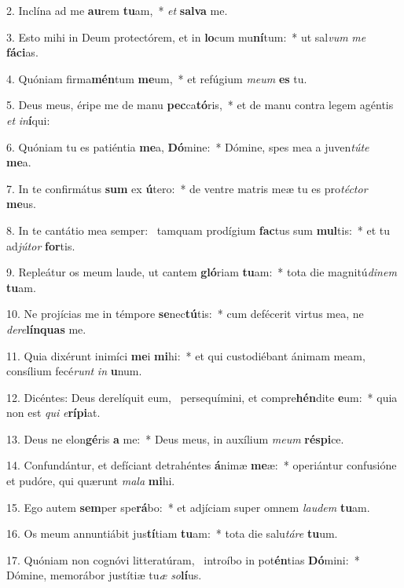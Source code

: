 2. Inclína ad me \textbf{au}rem \textbf{tu}am,~*  \textit{et} \textbf{sal}\textbf{va} me.\

3. Esto mihi in Deum protectórem, et in \textbf{lo}cum mu\textbf{ní}tum:~*  ut sal\textit{vum} \textit{me} \textbf{fá}\textbf{ci}as.\

4. Quóniam firma\textbf{mén}tum \textbf{me}um,~*  et refúgium \textit{me}\textit{um} \textbf{es} tu.\

5. Deus meus, éripe me de manu \textbf{pec}ca\textbf{tó}ris,~*  et de manu contra legem agéntis \textit{et} \textit{in}\textbf{í}qui:\

6. Quóniam tu es patiéntia \textbf{me}a, \textbf{Dó}mine:~*  Dómine, spes mea a juven\textit{tú}\textit{te} \textbf{me}a.\

7. In te confirmátus \textbf{sum} ex \textbf{ú}tero:~*  de ventre matris meæ tu es pro\textit{téc}\textit{tor} \textbf{me}us.\

8. In te cantátio mea semper: \dag\  tamquam prodígium \textbf{fac}tus sum \textbf{mul}tis:~*  et tu ad\textit{jú}\textit{tor} \textbf{for}tis.\

9. Repleátur os meum laude, ut cantem \textbf{gló}riam \textbf{tu}am:~*  tota die magnitú\textit{di}\textit{nem} \textbf{tu}am.\

10. Ne projícias me in témpore \textbf{se}nec\textbf{tú}tis:~*  cum defécerit virtus mea, ne \textit{de}\textit{re}\textbf{lín}\textbf{quas} me.\

11. Quia dixérunt inimíci \textbf{me}i \textbf{mi}hi:~*  et qui custodiébant ánimam meam, consílium fecé\textit{runt} \textit{in} \textbf{u}num.\

12. Dicéntes: Deus derelíquit eum, \dag\  persequímini, et compre\textbf{hén}dite \textbf{e}um:~*  quia non est \textit{qui} \textit{e}\textbf{rí}\textbf{pi}at.\

13. Deus ne elon\textbf{gé}ris \textbf{a} me:~*  Deus meus, in auxílium \textit{me}\textit{um} \textbf{ré}\textbf{spi}ce.\

14. Confundántur, et defíciant detrahéntes \textbf{á}nimæ \textbf{me}æ:~*  operiántur confusióne et pudóre, qui quærunt \textit{ma}\textit{la} \textbf{mi}hi.\

15. Ego autem \textbf{sem}per spe\textbf{rá}bo:~*  et adjíciam super omnem \textit{lau}\textit{dem} \textbf{tu}am.\

16. Os meum annuntiábit jus\textbf{tí}tiam \textbf{tu}am:~*  tota die salu\textit{tá}\textit{re} \textbf{tu}um.\

17. Quóniam non cognóvi litteratúram, \dag\  introíbo in pot\textbf{én}tias \textbf{Dó}mini:~*  Dómine, memorábor justítiæ tu\textit{æ} \textit{so}\textbf{lí}us.\

